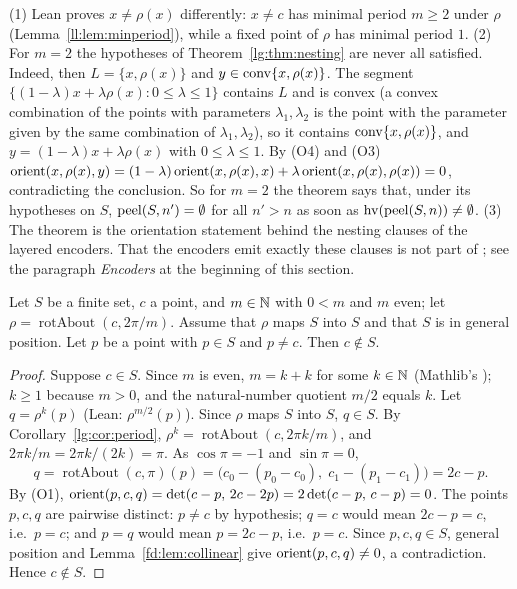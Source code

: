 \begin{remark}
(1) Lean proves $x\ne\rho(x)$ differently: $x\ne c$ has minimal period $m\ge2$ under $\rho$
(Lemma~\ref{ll:lem:minperiod}), while a fixed point of $\rho$ has minimal period $1$.
(2) For $m=2$ the hypotheses of Theorem~\ref{lg:thm:nesting} are never all satisfied. Indeed, then
$L=\{x,\rho(x)\}$ and $y\in\operatorname{conv}\{x,\rho(x)\}$. The segment $\{(1-\lambda)x+\lambda\rho(x):0\le\lambda\le1\}$ contains
$L$ and is convex (a convex combination of the points with parameters $\lambda_1,\lambda_2$ is the point with the
parameter given by the same combination of $\lambda_1,\lambda_2$), so it contains $\operatorname{conv}\{x,\rho(x)\}$, and
$y=(1-\lambda)x+\lambda\rho(x)$ with $0\le\lambda\le1$. By (O4)
and (O3) $\operatorname{orient}(x,\rho(x),y)=(1-\lambda)\operatorname{orient}(x,\rho(x),x)+\lambda\operatorname{orient}(x,\rho(x),\rho(x))=0$, contradicting the
conclusion. So for $m=2$ the theorem says that, under its hypotheses on $S$, $\operatorname{peel}(S,n')=\emptyset$ for all $n'>n$ as
soon as $\operatorname{hv}(\operatorname{peel}(S,n))\ne\emptyset$.
(3) The theorem is the orientation statement behind the nesting clauses of the layered encoders. That the encoders
emit exactly these clauses is not part of ; see the paragraph \emph{Encoders} at the
beginning of this section.
\end{remark}

\begin{lemma}\label{lg:lem:centre}
Let $S$ be a finite set, $c$ a point, and $m\in\mathbb N$ with $0<m$ and $m$ even; let $\rho=\operatorname{rotAbout}(c,2\pi/m)$.
Assume that $\rho$ maps $S$ into $S$ and that $S$ is in general position. Let $p$ be a point with $p\in S$ and
$p\ne c$. Then $c\notin S$.
\end{lemma}

\begin{proof}
Suppose $c\in S$. Since $m$ is even, $m=k+k$ for some $k\in\mathbb N$ (Mathlib's ); $k\ge1$ because $m>0$, and the
natural-number quotient $m/2$ equals $k$. Let $q=\rho^{k}(p)$ (Lean: $\rho^{m/2}(p)$). Since $\rho$ maps $S$ into $S$,
$q\in S$. By Corollary~\ref{lg:cor:period}, $\rho^{k}=\operatorname{rotAbout}(c,2\pi k/m)$, and
$2\pi k/m=2\pi k/(2k)=\pi$. As $\cos\pi=-1$ and $\sin\pi=0$,
\[
  q=\operatorname{rotAbout}(c,\pi)(p)=\bigl(c_0-(p_0-c_0),\;c_1-(p_1-c_1)\bigr)=2c-p .
\]
By (O1), $\operatorname{orient}(p,c,q)=\det(c-p,\,2c-2p)=2\det(c-p,\,c-p)=0$. The points $p,c,q$ are pairwise distinct: $p\ne c$ by
hypothesis; $q=c$ would mean $2c-p=c$, i.e.\ $p=c$; and $p=q$ would mean $p=2c-p$, i.e.\ $p=c$. Since $p,c,q\in S$,
general position and Lemma~\ref{fd:lem:collinear} give $\operatorname{orient}(p,c,q)\ne0$, a contradiction. Hence $c\notin S$.
\end{proof}

